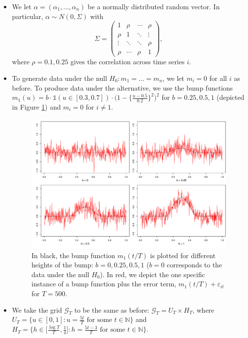 \documentclass[a4paper,12pt]{article}
\begin{document}
\begin{enumerate}[label=\arabic*.,leftmargin=0.6cm]
{\begin{itemize}[topsep=0pt]
\begin{itemize}[label=--,leftmargin=0.45cm,itemsep=0pt]
\item We let $\alpha = (\alpha_1,\ldots,\alpha_n)$ be a normally distributed random vector. In particular, $\alpha \sim N(0,\Sigma)$ with
\[ \Sigma =
\begin{pmatrix}
1      & \rho   & \cdots & \rho   \\
\rho   & 1      & \ddots & \vdots \\
\vdots & \ddots & \ddots & \rho   \\
\rho   & \cdots & \rho   & 1
\end{pmatrix},
\]
where $\rho = 0.1, 0.25$ gives the correlation across time series $i$.

\item To generate data under the null $H_0: m_1 = \ldots = m_n$, we let $m_i = 0$ for all $i$ as before. To produce data under the alternative, we use the bump functions $m_1(u) = b \cdot \mathbb{1}(u \in [0.3, 0.7]) \cdot \big(1 - \big\{\frac{u - 0.5}{0.2}\big\}^2\big)^2$ for $b = 0.25, 0.5, 1$ (depicted in Figure \ref{fig:bump_function}) and $m_i = 0$ for $i \neq 1$.

\begin{figure}[t!]
\includegraphics[width=\textwidth]{output/bump_function.pdf}
\caption{In black, the bump function $m_1(t/T)$ is plotted for different heights of the bump: $b = 0, 0.25, 0.5, 1$ ($b= 0$ corresponds to the data under the null $H_0$). In red, we depict the one specific instance of a bump function plus the error term, $m_1(t/T) + \varepsilon_{it}$ for $T=500$.}\label{fig:bump_function}
\end{figure}

\item We take the grid $\mathcal{G}_T$ to be the same as before: $\mathcal{G}_T = U_T \times H_T$, where $U_T = \big\{ u \in [0,1]: u = \textstyle{\frac{5t}{T}} \text{ for some } t \in \mathbb{N} \big\}$ and $H_T = \big\{ h \in \big[ \textstyle{\frac{\log T}{T}}, \textstyle{\frac{1}{4}} \big]:  h = \textstyle{\frac{5t - 3}{T}} \text{ for some } t \in \mathbb{N} \big\}$.


\end{itemize}
\end{itemize}}
\end{enumerate}
\end{document}
